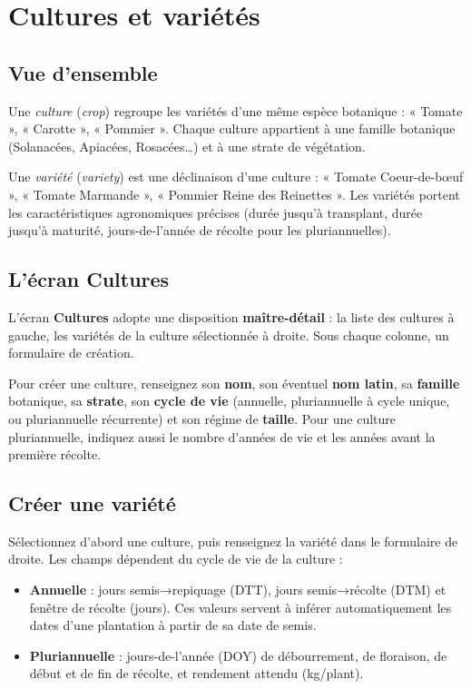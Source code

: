 \chapter{Cultures et variétés}
\label{chap:cultures}

\section{Vue d'ensemble}

Une \emph{culture} (\emph{crop}) regroupe les variétés d'une même espèce botanique : « Tomate », « Carotte », « Pommier ». Chaque culture appartient à une famille botanique (Solanacées, Apiacées, Rosacées…) et à une strate de végétation.

Une \emph{variété} (\emph{variety}) est une déclinaison d'une culture : « Tomate Coeur-de-bœuf », « Tomate Marmande », « Pommier Reine des Reinettes ». Les variétés portent les caractéristiques agronomiques précises (durée jusqu'à transplant, durée jusqu'à maturité, jours-de-l'année de récolte pour les pluriannuelles).

\section{L'écran Cultures}

L'écran \textbf{Cultures} adopte une disposition \textbf{maître-détail} : la liste des cultures à gauche, les variétés de la culture sélectionnée à droite. Sous chaque colonne, un formulaire de création.

Pour créer une culture, renseignez son \textbf{nom}, son éventuel \textbf{nom latin}, sa \textbf{famille} botanique, sa \textbf{strate}, son \textbf{cycle de vie} (annuelle, pluriannuelle à cycle unique, ou pluriannuelle récurrente) et son régime de \textbf{taille}. Pour une culture pluriannuelle, indiquez aussi le nombre d'années de vie et les années avant la première récolte.

\section{Créer une variété}

Sélectionnez d'abord une culture, puis renseignez la variété dans le formulaire de droite. Les champs dépendent du cycle de vie de la culture :

\begin{itemize}
  \item \textbf{Annuelle} : jours semis→repiquage (DTT), jours semis→récolte (DTM) et fenêtre de récolte (jours). Ces valeurs servent à inférer automatiquement les dates d'une plantation à partir de sa date de semis.
  \item \textbf{Pluriannuelle} : jours-de-l'année (DOY) de débourrement, de floraison, de début et de fin de récolte, et rendement attendu (kg/plant).
\end{itemize}
